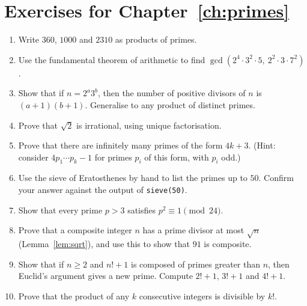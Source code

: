 \section*{Exercises for Chapter~\ref{ch:primes}}

\begin{enumerate}
  \item Write $360$, $1000$ and $2310$ as products of primes.
  \item Use the fundamental theorem of arithmetic to find $\gcd(2^4\cdot 3^2\cdot 5,\ 2^2\cdot 3\cdot 7^2)$.
  \item Show that if $n=2^a 3^b$, then the number of positive divisors of $n$ is $(a+1)(b+1)$. Generalise to any product of distinct primes.
  \item Prove that $\sqrt{2}$ is irrational, using unique factorisation.
  \item Prove that there are infinitely many primes of the form $4k+3$. (Hint: consider $4p_1\cdots p_k-1$ for primes $p_i$ of this form, with $p_i$ odd.)
  \item Use the sieve of Eratosthenes by hand to list the primes up to $50$. Confirm your answer against the output of \texttt{sieve(50)}.
  \item Show that every prime $p>3$ satisfies $p^2\equiv 1\pmod{24}$.
  \item Prove that a composite integer $n$ has a prime divisor at most $\sqrt{n}$ (Lemma~\ref{lem:sqrt}), and use this to show that $91$ is composite.
  \item Show that if $n\ge 2$ and $n!+1$ is composed of primes greater than $n$, then Euclid's argument gives a new prime. Compute $2!+1$, $3!+1$ and $4!+1$.
  \item Prove that the product of any $k$ consecutive integers is divisible by $k!$.
\end{enumerate}
